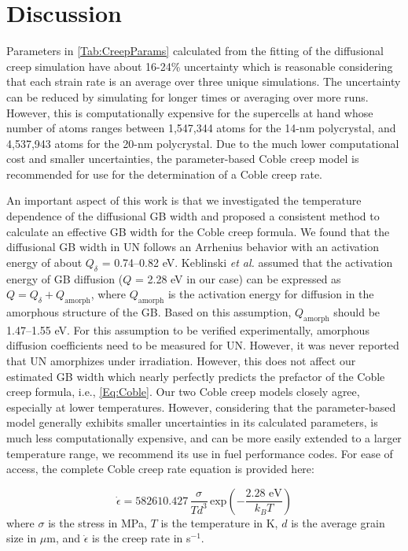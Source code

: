 \documentclass[preprint, 12pt]{elsarticle}
\newcommand{\?}{\stackrel{?}{=}}
\begin{document}
\section{Discussion}


Parameters in \cref{Tab:CreepParams} calculated from the fitting of the diffusional creep simulation have about 16-24\% uncertainty which is reasonable considering that each strain rate is an average over three unique simulations. The uncertainty can be reduced by simulating for longer times or averaging over more runs. However, this is computationally expensive for the supercells at hand whose number of atoms ranges between 1,547,344 atoms for the 14-nm polycrystal, and 4,537,943 atoms for the 20-nm polycrystal. Due to the much lower computational cost and smaller uncertainties, the parameter-based Coble creep model is recommended for use for the determination of a Coble creep rate. 

An important aspect of this work is that we investigated the temperature dependence of the diffusional GB width and proposed a consistent method to calculate an effective GB width for the Coble creep formula. We found that the diffusional GB width in UN follows an Arrhenius behavior with an activation energy of about $Q_\delta$ = 0.74--0.82 eV. Keblinski \textit{et al.} \cite{Keblinski1999} assumed that the activation energy of GB diffusion ($Q$ = 2.28 eV in our case) can be expressed as $Q = Q_\delta + Q_\mathrm{amorph}$, where $Q_\mathrm{amorph}$ is the activation energy for diffusion in the amorphous structure of the GB. Based on this assumption, $Q_\mathrm{amorph}$ should be 1.47--1.55 eV. For this assumption to be verified experimentally, amorphous diffusion coefficients need to be measured for UN. However, it was never reported that UN amorphizes under irradiation. However, this does not affect our estimated GB width which nearly perfectly predicts the prefactor of the Coble creep formula, i.e., \cref{Eq:Coble}. Our two Coble creep models closely agree, especially at lower temperatures. However, considering that the parameter-based model generally exhibits smaller uncertainties in its calculated parameters, is much less computationally expensive, and can be more easily extended to a larger temperature range, we recommend its use in fuel performance codes. For ease of access, the complete Coble creep rate equation is provided here:

\begin{equation}
    \Dot{\epsilon} = 582610.427 \, \frac{\sigma}{T d^3} \, \mathrm{exp} \! \left( - \frac{2.28 \text{ eV}}{k_B T} \right)
    \label{Eq:OurModel}
\end{equation}
where $\sigma$ is the stress in MPa, $T$ is the temperature in K, $d$ is the average grain size in $\mu$m, and $\Dot{\epsilon}$ is the creep rate in s$^{-1}$. 
\end{document}

